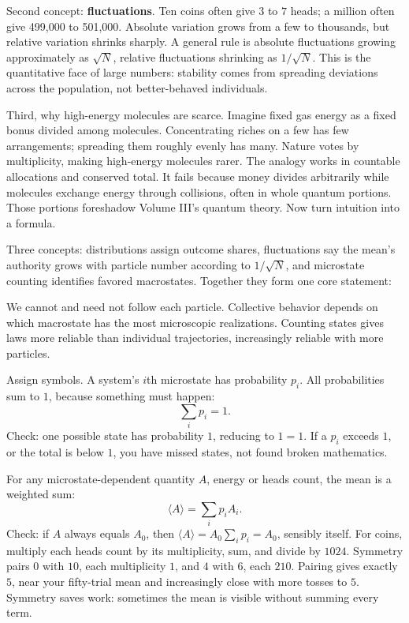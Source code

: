 Second concept: \textbf{fluctuations}. Ten coins often give \(3\) to \(7\) heads; a million often give 499,000 to 501,000. Absolute variation grows from a few to thousands, but relative variation shrinks sharply. A general rule is absolute fluctuations growing approximately as \(\sqrt{N}\), relative fluctuations shrinking as \(1/\sqrt{N}\). This is the quantitative face of large numbers: stability comes from spreading deviations across the population, not better-behaved individuals.

Third, why high-energy molecules are scarce. Imagine fixed gas energy as a fixed bonus divided among molecules. Concentrating riches on a few has few arrangements; spreading them roughly evenly has many. Nature votes by multiplicity, making high-energy molecules rarer. The analogy works in countable allocations and conserved total. It fails because money divides arbitrarily while molecules exchange energy through collisions, often in whole quantum portions. Those portions foreshadow Volume III's quantum theory. Now turn intuition into a formula.


Three concepts: distributions assign outcome shares, fluctuations say the mean's authority grows with particle number according to \(1/\sqrt{N}\), and microstate counting identifies favored macrostates. Together they form one core statement:

\begin{oneline}
We cannot and need not follow each particle. Collective behavior depends on which macrostate has the most microscopic realizations. Counting states gives laws more reliable than individual trajectories, increasingly reliable with more particles.
\end{oneline}


Assign symbols. A system's \(i\)th microstate has probability \(p_i\). All probabilities sum to \(1\), because something must happen:
\[
\sum_i p_i = 1 .
\]
Check: one possible state has probability \(1\), reducing to \(1=1\). If a \(p_i\) exceeds \(1\), or the total is below \(1\), you have missed states, not found broken mathematics.

For any microstate-dependent quantity \(A\), energy or heads count, the mean is a weighted sum:
\[
\langle A \rangle = \sum_i p_i A_i .
\]
Check: if \(A\) always equals \(A_0\), then \(\langle A\rangle = A_0\sum_i p_i = A_0\), sensibly itself. For coins, multiply each heads count by its multiplicity, sum, and divide by \(1024\). Symmetry pairs \(0\) with \(10\), each multiplicity \(1\), and \(4\) with \(6\), each \(210\). Pairing gives exactly \(5\), near your fifty-trial mean and increasingly close with more tosses to \(5\). Symmetry saves work: sometimes the mean is visible without summing every term.


